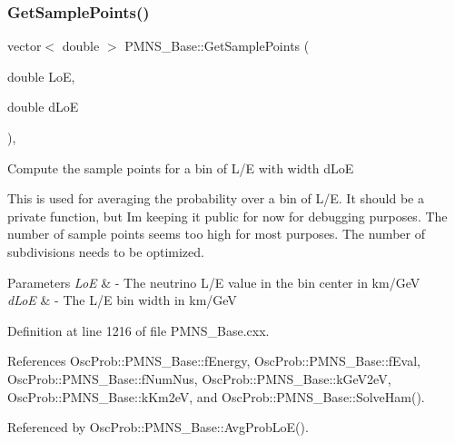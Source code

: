 \subsubsection{\texorpdfstring{Get\+Sample\+Points()}{GetSamplePoints()}}
{\footnotesize\ttfamily vector$<$ double $>$ P\+M\+N\+S\+\_\+\+Base\+::\+Get\+Sample\+Points (\begin{DoxyParamCaption}\item[{double}]{LoE,  }\item[{double}]{d\+LoE }\end{DoxyParamCaption})\hspace{0.3cm}{\ttfamily [virtual]}, {\ttfamily [inherited]}}

Compute the sample points for a bin of L/E with width d\+LoE

This is used for averaging the probability over a bin of L/E. It should be a private function, but I\textquotesingle{}m keeping it public for now for debugging purposes. The number of sample points seems too high for most purposes. The number of subdivisions needs to be optimized.


\begin{DoxyParams}{Parameters}
{\em LoE} & -\/ The neutrino L/E value in the bin center in km/\+GeV \\
\hline
{\em d\+LoE} & -\/ The L/E bin width in km/\+GeV \\
\hline
\end{DoxyParams}


Definition at line 1216 of file P\+M\+N\+S\+\_\+\+Base.\+cxx.



References Osc\+Prob\+::\+P\+M\+N\+S\+\_\+\+Base\+::f\+Energy, Osc\+Prob\+::\+P\+M\+N\+S\+\_\+\+Base\+::f\+Eval, Osc\+Prob\+::\+P\+M\+N\+S\+\_\+\+Base\+::f\+Num\+Nus, Osc\+Prob\+::\+P\+M\+N\+S\+\_\+\+Base\+::k\+Ge\+V2eV, Osc\+Prob\+::\+P\+M\+N\+S\+\_\+\+Base\+::k\+Km2eV, and Osc\+Prob\+::\+P\+M\+N\+S\+\_\+\+Base\+::\+Solve\+Ham().



Referenced by Osc\+Prob\+::\+P\+M\+N\+S\+\_\+\+Base\+::\+Avg\+Prob\+Lo\+E().


